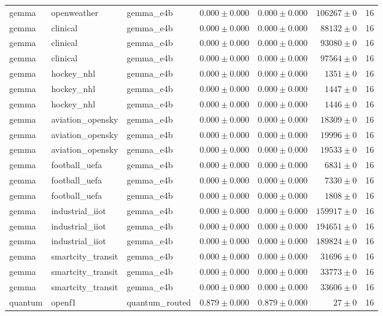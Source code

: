 \begin{table}[htbp]
\begin{tabular}{l l l r r r r}
gemma & openweather & gemma\_e4b & $0.000\pm0.000$ & $0.000\pm0.000$ & $106267\pm0$ & 16 \\
gemma & clinical & gemma\_e4b & $0.000\pm0.000$ & $0.000\pm0.000$ & $88132\pm0$ & 16 \\
gemma & clinical & gemma\_e4b & $0.000\pm0.000$ & $0.000\pm0.000$ & $93080\pm0$ & 16 \\
gemma & clinical & gemma\_e4b & $0.000\pm0.000$ & $0.000\pm0.000$ & $97564\pm0$ & 16 \\
gemma & hockey\_nhl & gemma\_e4b & $0.000\pm0.000$ & $0.000\pm0.000$ & $1351\pm0$ & 16 \\
gemma & hockey\_nhl & gemma\_e4b & $0.000\pm0.000$ & $0.000\pm0.000$ & $1447\pm0$ & 16 \\
gemma & hockey\_nhl & gemma\_e4b & $0.000\pm0.000$ & $0.000\pm0.000$ & $1446\pm0$ & 16 \\
gemma & aviation\_opensky & gemma\_e4b & $0.000\pm0.000$ & $0.000\pm0.000$ & $18309\pm0$ & 16 \\
gemma & aviation\_opensky & gemma\_e4b & $0.000\pm0.000$ & $0.000\pm0.000$ & $19996\pm0$ & 16 \\
gemma & aviation\_opensky & gemma\_e4b & $0.000\pm0.000$ & $0.000\pm0.000$ & $19533\pm0$ & 16 \\
gemma & football\_uefa & gemma\_e4b & $0.000\pm0.000$ & $0.000\pm0.000$ & $6831\pm0$ & 16 \\
gemma & football\_uefa & gemma\_e4b & $0.000\pm0.000$ & $0.000\pm0.000$ & $7330\pm0$ & 16 \\
gemma & football\_uefa & gemma\_e4b & $0.000\pm0.000$ & $0.000\pm0.000$ & $1808\pm0$ & 16 \\
gemma & industrial\_iiot & gemma\_e4b & $0.000\pm0.000$ & $0.000\pm0.000$ & $159917\pm0$ & 16 \\
gemma & industrial\_iiot & gemma\_e4b & $0.000\pm0.000$ & $0.000\pm0.000$ & $194651\pm0$ & 16 \\
gemma & industrial\_iiot & gemma\_e4b & $0.000\pm0.000$ & $0.000\pm0.000$ & $189824\pm0$ & 16 \\
gemma & smartcity\_transit & gemma\_e4b & $0.000\pm0.000$ & $0.000\pm0.000$ & $31696\pm0$ & 16 \\
gemma & smartcity\_transit & gemma\_e4b & $0.000\pm0.000$ & $0.000\pm0.000$ & $33773\pm0$ & 16 \\
gemma & smartcity\_transit & gemma\_e4b & $0.000\pm0.000$ & $0.000\pm0.000$ & $33606\pm0$ & 16 \\
quantum & openf1 & quantum\_routed & $0.879\pm0.000$ & $0.879\pm0.000$ & $27\pm0$ & 16 \\

\end{tabular}
\end{table}
